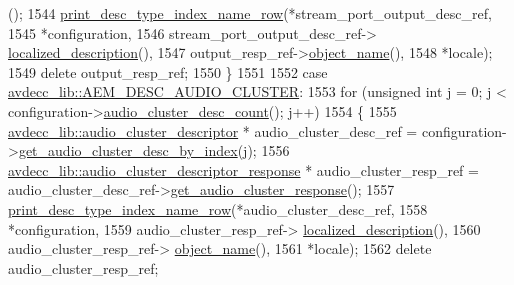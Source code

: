 \begin{DoxyCode}
      ();
1544                 \hyperlink{classcmd__line_ac47c21c03b69593b74e7c43201d0ba41}{print\_desc\_type\_index\_name\_row}(*stream\_port\_output\_desc\_ref,
1545                                                *configuration,
1546                                                stream\_port\_output\_desc\_ref->
      \hyperlink{classavdecc__lib_1_1descriptor__base_a1fb9de45567df344090a1407aa6b775f}{localized\_description}(),
1547                                                output\_resp\_ref->\hyperlink{classavdecc__lib_1_1descriptor__response__base_a133f7774946d80f82b8aaaa4cfbb7361}{object\_name}(),
1548                                                *locale);
1549                 \textcolor{keyword}{delete} output\_resp\_ref;
1550             \}
1551 
1552         \textcolor{keywordflow}{case} \hyperlink{namespaceavdecc__lib_ac7b7d227e46bc72b63ee9e9aae15902fa84158b480b7b6ff17f874ab717903428}{avdecc\_lib::AEM\_DESC\_AUDIO\_CLUSTER}:
1553             \textcolor{keywordflow}{for} (\textcolor{keywordtype}{unsigned} \textcolor{keywordtype}{int} j = 0; j < configuration->\hyperlink{classavdecc__lib_1_1configuration__descriptor_a4fb6d1822e990aca2ea3993effbea267}{audio\_cluster\_desc\_count}();
       j++)
1554             \{
1555                 \hyperlink{classavdecc__lib_1_1audio__cluster__descriptor}{avdecc\_lib::audio\_cluster\_descriptor} * 
      audio\_cluster\_desc\_ref = configuration->\hyperlink{classavdecc__lib_1_1configuration__descriptor_a36bc7f659fca61d1057b4250d4a92ca8}{get\_audio\_cluster\_desc\_by\_index}(j);
1556                 \hyperlink{classavdecc__lib_1_1audio__cluster__descriptor__response}{avdecc\_lib::audio\_cluster\_descriptor\_response} 
      * audio\_cluster\_resp\_ref = audio\_cluster\_desc\_ref->\hyperlink{classavdecc__lib_1_1audio__cluster__descriptor_a82a4cedea1831a2939eccdf79d96986b}{get\_audio\_cluster\_response}();
1557                 \hyperlink{classcmd__line_ac47c21c03b69593b74e7c43201d0ba41}{print\_desc\_type\_index\_name\_row}(*audio\_cluster\_desc\_ref,
1558                                                *configuration,
1559                                                audio\_cluster\_resp\_ref->
      \hyperlink{classavdecc__lib_1_1audio__cluster__descriptor__response_a1fb9de45567df344090a1407aa6b775f}{localized\_description}(),
1560                                                audio\_cluster\_resp\_ref->
      \hyperlink{classavdecc__lib_1_1descriptor__response__base_a133f7774946d80f82b8aaaa4cfbb7361}{object\_name}(),
1561                                                *locale);
1562                 \textcolor{keyword}{delete} audio\_cluster\_resp\_ref;

\end{DoxyCode}
